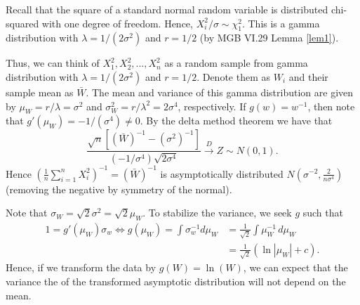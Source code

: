 \documentclass{stat_homework}
\begin{document}
\begin{solution}
Recall that the square of a standard normal random variable is distributed chi-squared with one degree of freedom.  Hence, $X_i^2/\sigma \sim \chi^2_1$.  This is a gamma distribution with $\lambda = 1/(2\sigma^2)$ and $r= 1/2$ (by MGB VI.29 Lemma \ref{lem1}).  

Thus, we can think of $X_1^2,X_2^2,...,X_n^2$ as a random sample from gamma distribution with $\lambda = 1/(2\sigma^2)$ and $r=1/2$.  Denote them as $W_i$ and their sample mean as $\bar W$.  The mean and variance of this gamma distribution are given by $\mu_W = r/\lambda = \sigma^2$ and $\sigma_W^2= r/\lambda^2 = 2 \sigma^4$, respectively. If $g(w) = w^{-1}$, then note that $g'(\mu_W) = -1/(\sigma^4) \not= 0$.  By the delta method theorem we have that 
$$
  \frac{ \sqrt n \left[(\bar W)^{-1} - (\sigma^2)^{-1}\right]} { \left(-1/\sigma^4\right) \sqrt{2 \sigma^4} } \stackrel{D}{\longrightarrow} Z \sim N(0,1).
$$
Hence $\left(\frac 1n \sum_{i=1}^n X_i^2\right)^{-1} = (\bar W)^{-1}$ is asymptotically distributed $N(\sigma^{-2}, \frac 2{n\sigma^4})$ (removing the negative by symmetry of the normal).  
\end{solution}


\begin{solution}
Note that $\sigma_W = \sqrt 2 \sigma^2 = \sqrt 2 \mu_W$. To stabilize the variance, we seek $g$ such that 
\begin{align*}
  1 = g'(\mu_W) \sigma_w \iff g(\mu_W) = \int \sigma_w^{-1} d\mu_W 
  &= \frac 1{\sqrt 2}\int \mu_W^{-1}\,d\mu_W\\
  &= \frac 1{\sqrt 2}(\ln |\mu_W| + c).
\end{align*}
Hence, if we transform the data by $g(W) = \ln(W)$, we can expect that the variance the of the transformed asymptotic distribution will not depend on the mean. 
\end{solution}
\end{document}
